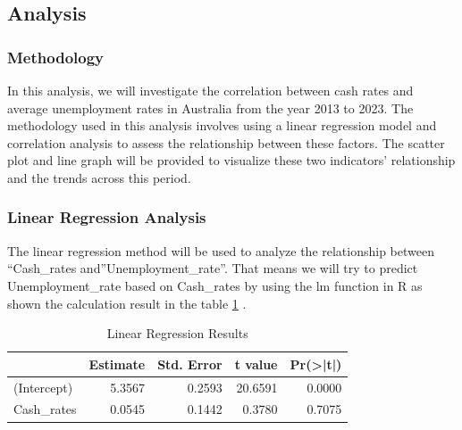 \documentclass[11pt,a4paper,]{article}
\begin{document}
\begin{quote}
\end{quote}

\hypertarget{analysis}{%
\subsection{Analysis}\label{analysis}}

\hypertarget{methodology-2}{%
\subsubsection{Methodology}\label{methodology-2}}

In this analysis, we will investigate the correlation between cash rates and average unemployment rates in Australia from the year 2013 to 2023. The methodology used in this analysis involves using a linear regression model and correlation analysis to assess the relationship between these factors. The scatter plot and line graph will be provided to visualize these two indicators' relationship and the trends across this period.

\hypertarget{linear-regression-analysis}{%
\subsubsection{Linear Regression Analysis}\label{linear-regression-analysis}}

The linear regression method will be used to analyze the relationship between ``Cash\_rates and''Unemployment\_rate''. That means we will try to predict Unemployment\_rate based on Cash\_rates by using the lm function in R as shown the calculation result in the table \ref{tab:linear} .

\begin{table}

\caption{\label{tab:linear}Linear Regression Results}
\centering
\begin{tabular}[t]{l|r|r|r|r}
\hline
  & Estimate & Std. Error & t value & Pr(>|t|)\\
\hline
(Intercept) & 5.3567 & 0.2593 & 20.6591 & 0.0000\\
\hline
Cash\_rates & 0.0545 & 0.1442 & 0.3780 & 0.7075\\
\hline
\end{tabular}
\end{table}

\begin{quote}
\end{quote}
\end{document}
